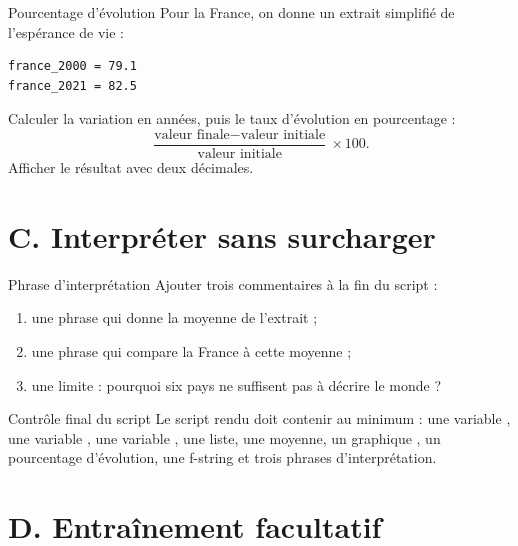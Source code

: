 \documentclass[11pt,a4paper]{article}
\begin{document}
\begin{mandatoryexercise}{Pourcentage d'évolution}
Pour la France, on donne un extrait simplifié de l'espérance de vie :
\begin{lstlisting}
france_2000 = 79.1
france_2021 = 82.5
\end{lstlisting}
Calculer la variation en années, puis le taux d'évolution en pourcentage :
\[
\frac{\text{valeur finale} - \text{valeur initiale}}{\text{valeur initiale}} \times 100.
\]
Afficher le résultat avec deux décimales.
\end{mandatoryexercise}

\section*{C. Interpréter sans surcharger}

\begin{mandatoryexercise}{Phrase d'interprétation}
Ajouter trois commentaires à la fin du script :
\begin{enumerate}
  \item une phrase qui donne la moyenne de l'extrait ;
  \item une phrase qui compare la France à cette moyenne ;
  \item une limite : pourquoi six pays ne suffisent pas à décrire le monde ?
\end{enumerate}
\end{mandatoryexercise}

\begin{mandatoryexercise}{Contrôle final du script}
Le script rendu doit contenir au minimum : une variable , une variable , une variable , une liste, une moyenne, un graphique , un pourcentage d'évolution, une f-string et trois phrases d'interprétation.
\end{mandatoryexercise}

\section*{D. Entraînement facultatif}
\end{document}
